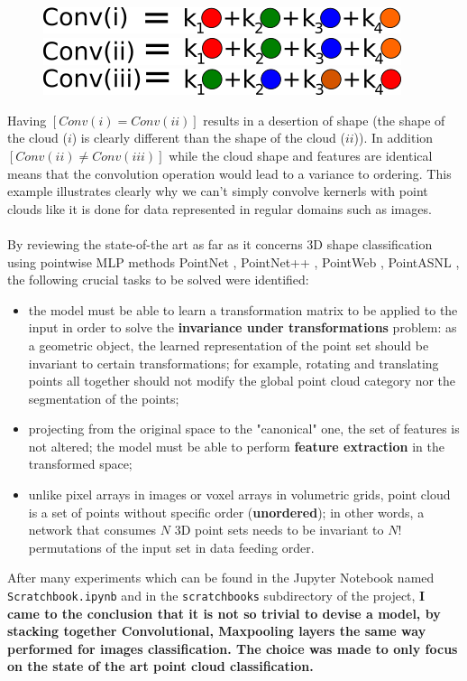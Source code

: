 \documentclass[11pt,a4paper]{article}
\begin{document}
\begin{figure}[H]
    \centering
    \includegraphics[scale=0.6]{imgs/conv-pointcloud-problem-computation-1.png}\\
    \includegraphics[scale=0.6]{imgs/conv-pointcloud-problem-computation-2.png}\\
    \includegraphics[scale=0.6]{imgs/conv-pointcloud-problem-computation-3.png}
\end{figure}
\noindent
Having $[Conv(i) = Conv(ii)]$ results in a desertion of shape (the shape of the cloud ($i$) is clearly different than the shape of the cloud ($ii$)). In addition $[Conv(ii) \neq Conv(iii)]$ while the cloud shape and features are identical means that the convolution operation would lead to a variance to ordering.  This example illustrates clearly why we can't simply convolve kernerls with point clouds like it is done for data represented in regular domains such as images.\\
\\
By reviewing the state-of-the art as far as it concerns 3D shape classification using pointwise MLP methods PointNet \cite{qi2017pointnet}, PointNet++ \cite{qi2017pointnetplus}, PointWeb \cite{8954075}, PointASNL \cite{yan2020pointasnl}, the following crucial tasks to be solved were identified:
\begin{itemize}
    \item the model must be able to learn a transformation matrix to be applied to the input in order to solve the \textbf{invariance under transformations} problem: as a geometric object, the learned representation of the point set should be invariant to certain transformations; for example, rotating and translating points all together should not modify the global point cloud category nor the segmentation of the points;
    \item projecting from the original space to the "canonical" one, the set of features is not altered; the model must be able to perform \textbf{feature extraction} in the transformed space;
    \item unlike pixel arrays in images or voxel arrays in volumetric grids, point cloud is a set of points without specific order (\textbf{unordered}); in other words, a network that consumes $N$ 3D point sets needs to be invariant to $N!$ permutations of the input set in data feeding order.
\end{itemize}
After many experiments which can be found in the Jupyter Notebook named \texttt{Scratchbook.ipynb} and in the \texttt{scratchbooks} subdirectory of the project, \textbf{I came to the conclusion that it is not so trivial to devise a model, by stacking together Convolutional, Maxpooling layers the same way performed for images classification. The choice was made to only focus on the state of the art point cloud classification.}
\end{document}
